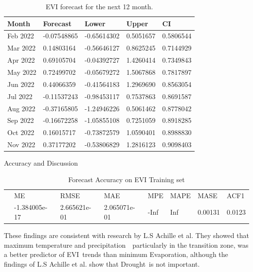 \documentclass[11pt]{beamer}
\begin{document}
\begin{frame}{}
        	\begin{table}[]
        			\label{table:Prediction}
        			\caption{EVI forecast for the next 12 month.}
        			\centering
        			\addtolength{\tabcolsep}{5pt}
        			\begin{tabularx}{\textwidth}{@{}lllll@{}}
        				\toprule
        				Month       & Forecast& Lower  &   Upper  &CI\\
        				\bottomrule
        		Feb 2022&-0.07548865& -0.65614302& 0.5051657& 0.5806544\\
        		Mar 2022& 0.14803164& -0.56646127& 0.8625245& 0.7144929\\
        		Apr 2022& 0.69105704& -0.04392727& 1.4260414& 0.7349843\\
        		May 2022& 0.72499702& -0.05679272& 1.5067868& 0.7817897\\
        		Jun 2022& 0.44066359& -0.41564183& 1.2969690& 0.8563054\\
        		Jul 2022&-0.11537243& -0.98453117& 0.7537863& 0.8691587\\
        		Aug 2022&-0.37165805& -1.24946226& 0.5061462& 0.8778042\\
        		Sep 2022&-0.16672258& -1.05855108& 0.7251059& 0.8918285\\
        		Oct 2022& 0.16015717& -0.73872579& 1.0590401& 0.8988830\\
        		Nov 2022&  0.37177202& -0.53806829& 1.2816123& 0.9098403\\
        				\bottomrule
        			\end{tabularx}
        	\end{table}   
\end{frame}
\begin{frame}{Accuracy and Discussion}
	\begin{table}
		\label{label: Accuracy}
		\caption{Forecast Accuracy on EVI Training set}
		\centering
		\small
		\addtolength{\tabcolsep}{-4pt}
		\begin{tabular}{llllllll}
			\hline\hline
		& ME	       & RMSE        &MAE          &MPE   &MAPE& MASE        &ACF1 \\
		              &-1.384005e-17& 2.665621e-01& 2.065071e-01&-Inf  &Inf & 0.00131& 0.0123\\
		\hline
\end{tabular}
\end{table}
	\begin{block}{}
		These findings are consistent with research by L.S Achille et al. They showed that maximum temperature and precipitation  particularly in the transition zone, was a better predictor of EVI trends than minimum Evaporation, although the findings of L.S Achille et al. show that Drought is not important.
	\end{block}
\end{frame}
\end{document}
